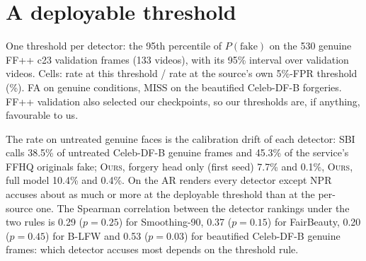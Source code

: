\documentclass[10pt]{article}
\newcommand{\oursB}{\textsc{Ours}, forgery head only}
\newcommand{\oursF}{\textsc{Ours}, full model}
\begin{document}
\section{A deployable threshold}
\label{sec:deploy}
\begin{table}[H]
\centering
\caption{One threshold per detector: the 95th percentile of $P(\text{fake})$ on the 530 genuine FF++ c23 validation frames (133
videos), with its 95\% interval over validation videos. Cells: rate at this threshold / rate at the source's own 5\%-FPR
threshold (\%). FA on genuine conditions, MISS on the beautified Celeb-DF-B forgeries. FF++ validation also selected our
checkpoints, so our thresholds are, if anything, favourable to us.}
\label{tab:deploy}
\scriptsize
\begin{adjustbox}{max width=\linewidth}\end{adjustbox}
\end{table}
The rate on untreated genuine faces is the calibration drift of each detector: SBI calls 38.5\% of untreated Celeb-DF-B genuine
frames and 45.3\% of the service's FFHQ originals fake; \oursB{} (first seed) 7.7\% and 0.1\%, \oursF{} 10.4\% and 0.4\%. On the AR renders every detector
except NPR accuses about as much or more at the deployable threshold than at the per-source one. The Spearman correlation between
the detector rankings under the two rules is 0.29 ($p=0.25$) for Smoothing-90, 0.37 ($p=0.15$) for FairBeauty, 0.20 ($p=0.45$)
for B-LFW and 0.53 ($p=0.03$) for beautified Celeb-DF-B genuine frames: which detector accuses most depends on the threshold rule.
\end{document}
